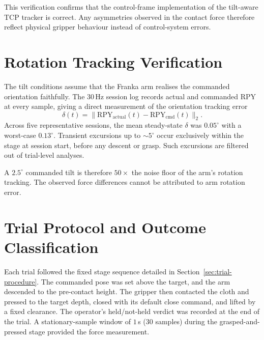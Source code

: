 This verification confirms that the control-frame implementation of the
tilt-aware TCP tracker is correct. Any asymmetries observed in the
contact force therefore reflect physical gripper behaviour instead of
control-system errors.

\section{Rotation Tracking Verification}
\label{sec:rotation-verify}

The tilt conditions assume that the Franka arm realises the commanded
orientation faithfully. The 30\,Hz session log records actual and
commanded RPY at every sample, giving a direct measurement of the
orientation tracking error
\begin{equation}
  \delta(t) = \| \mathrm{RPY}_{\text{actual}}(t) -
                 \mathrm{RPY}_{\text{cmd}}(t) \|_2.
\end{equation}
Across five representative sessions, the mean steady-state $\delta$
was $0.05^{\circ}$ with a worst-case $0.13^{\circ}$. Transient
excursions up to $\sim 5^{\circ}$ occur exclusively within the
 stage at session start, before any descent
or grasp. Such excursions are filtered out of trial-level analyses.

A $2.5^{\circ}$ commanded tilt is therefore $50\times$ the noise floor
of the arm's rotation tracking. The observed force differences cannot
be attributed to arm rotation error.

\section{Trial Protocol and Outcome Classification}
\label{sec:trial-protocol}

Each trial followed the fixed stage sequence detailed in
Section~\ref{sec:trial-procedure}. The commanded pose was set above the
target, and the arm descended to the pre-contact height. The gripper
then contacted the cloth and pressed to the target depth, closed with
its default close command, and lifted by a fixed clearance. The
operator's held/not-held verdict was recorded at the end of the trial.
A stationary-sample window of $1$\,s (30 samples) during the
grasped-and-pressed stage provided the force measurement.

